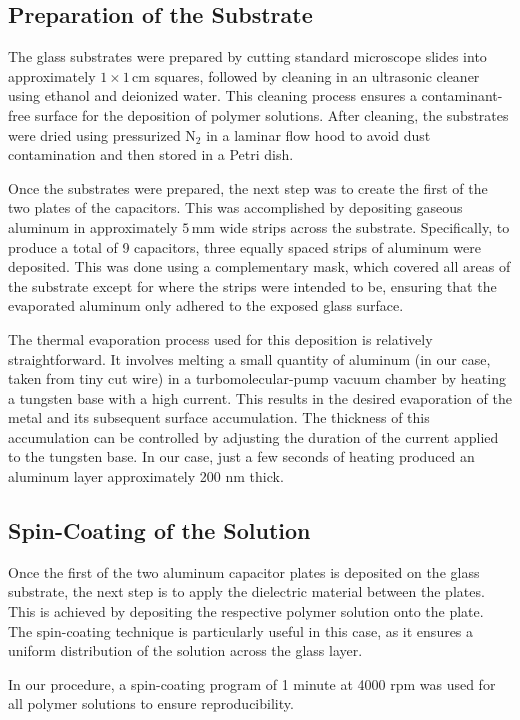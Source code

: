 \subsection{Preparation of the Substrate}

The glass substrates were prepared by cutting standard microscope slides into approximately $1 \times 1 \, \text{cm}$ squares, followed by cleaning in an ultrasonic cleaner using ethanol and deionized water. This cleaning process ensures a contaminant-free surface for the deposition of polymer solutions. After cleaning, the substrates were dried using pressurized $\text{N}_2$ in a laminar flow hood to avoid dust contamination and then stored in a Petri dish.

Once the substrates were prepared, the next step was to create the first of the two plates of the capacitors. This was accomplished by depositing gaseous aluminum in approximately $5 \, \text{mm}$ wide strips across the substrate. Specifically, to produce a total of 9 capacitors, three equally spaced strips of aluminum were deposited. This was done using a complementary mask, which covered all areas of the substrate except for where the strips were intended to be, ensuring that the evaporated aluminum only adhered to the exposed glass surface.

The thermal evaporation process used for this deposition is relatively straightforward. It involves melting a small quantity of aluminum (in our case, taken from tiny cut wire) in a turbomolecular-pump vacuum chamber by heating a tungsten base with a high current. This results in the desired evaporation of the metal and its subsequent surface accumulation. The thickness of this accumulation can be controlled by adjusting the duration of the current applied to the tungsten base. In our case, just a few seconds of heating produced an aluminum layer approximately 200 nm thick.
\subsection{Spin-Coating of the Solution}

Once the first of the two aluminum capacitor plates is deposited on the glass substrate, the next step is to apply the dielectric material between the plates. This is achieved by depositing the respective polymer solution onto the plate. The spin-coating technique is particularly useful in this case, as it ensures a uniform distribution of the solution across the glass layer.

In our procedure, a spin-coating program of 1 minute at 4000 rpm was used for all polymer solutions to ensure reproducibility.

